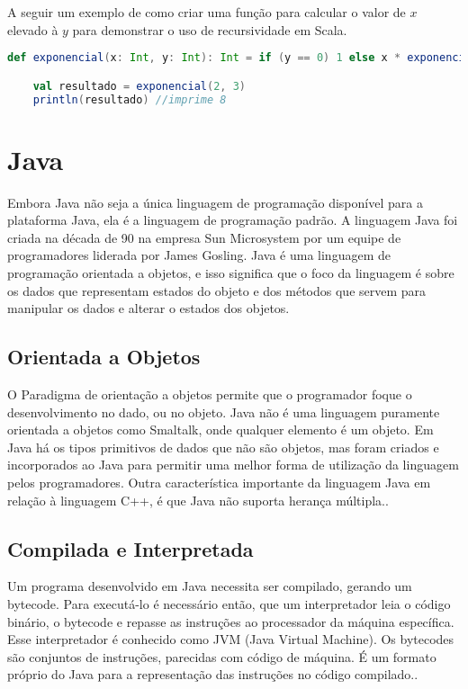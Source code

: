     A seguir um exemplo de como criar uma função para calcular o valor de $x$ elevado à $y$ para demonstrar o uso de recursividade em Scala.

    \begin{lstlisting}[language=Scala, mathescape=false]
    def exponencial(x: Int, y: Int): Int = if (y == 0) 1 else x * exponencial(x, (y - 1))

    val resultado = exponencial(2, 3)
    println(resultado) //imprime 8
    \end{lstlisting}

  \section{Java}

  Embora Java não seja a única linguagem de programação disponível para a plataforma Java, ela é a linguagem de programação padrão. A linguagem Java foi criada na década de 90 na empresa Sun Microsystem por um equipe de programadores liderada por James Gosling. Java é uma linguagem de programação orientada a objetos, e isso significa que o foco da linguagem é sobre os dados que representam estados do objeto e dos métodos que servem para manipular os dados e alterar o estados dos objetos.

    \subsection{Orientada a Objetos}

    O Paradigma de orientação a objetos permite que o programador foque o desenvolvimento no dado, ou no objeto. Java não é uma linguagem puramente orientada a objetos como Smaltalk, onde qualquer elemento é um objeto. Em Java há os tipos primitivos de dados que não são objetos, mas foram criados e incorporados ao Java para permitir uma melhor forma de utilização da linguagem pelos programadores. Outra característica importante da linguagem Java em relação à linguagem C++, é que Java não suporta herança múltipla.\cite{aprendaJava}.

    \subsection{Compilada e Interpretada}

    Um programa desenvolvido em Java necessita ser compilado, gerando um bytecode. Para executá-lo é necessário então, que um interpretador leia o código binário, o bytecode e repasse as instruções ao processador da máquina específica. Esse interpretador é conhecido como JVM (Java Virtual Machine). Os bytecodes são conjuntos de instruções, parecidas com código de máquina. É um formato próprio do Java para a representação das instruções no código compilado.\cite{aprendaJava}.

